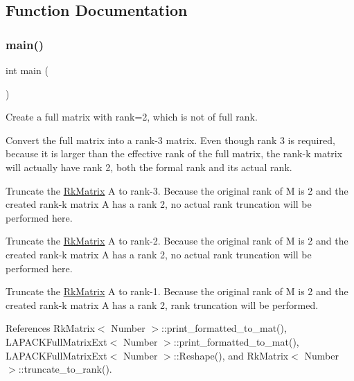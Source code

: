 \subsection{Function Documentation}
\mbox{\label{rkmatrix-truncate-to-rank_8cc_ae66f6b31b5ad750f1fe042a706a4e3d4}} 
\subsubsection{\texorpdfstring{main()}{main()}}
{\footnotesize\ttfamily int main (\begin{DoxyParamCaption}{ }\end{DoxyParamCaption})}

Create a full matrix with rank=2, which is not of full rank.

Convert the full matrix into a rank-\/3 matrix. Even though rank 3 is required, because it is larger than the effective rank of the full matrix, the rank-\/k matrix will actually have rank 2, both the formal rank and its actual rank.

Truncate the \hyperlink{classRkMatrix}{Rk\+Matrix} {\ttfamily A} to rank-\/3. Because the original rank of {\ttfamily M} is 2 and the created rank-\/k matrix {\ttfamily A} has a rank 2, no actual rank truncation will be performed here.

Truncate the \hyperlink{classRkMatrix}{Rk\+Matrix} {\ttfamily A} to rank-\/2. Because the original rank of {\ttfamily M} is 2 and the created rank-\/k matrix {\ttfamily A} has a rank 2, no actual rank truncation will be performed here.

Truncate the \hyperlink{classRkMatrix}{Rk\+Matrix} {\ttfamily A} to rank-\/1. Because the original rank of {\ttfamily M} is 2 and the created rank-\/k matrix {\ttfamily A} has a rank 2, rank truncation will be performed.

References Rk\+Matrix$<$ Number $>$\+::print\+\_\+formatted\+\_\+to\+\_\+mat(), L\+A\+P\+A\+C\+K\+Full\+Matrix\+Ext$<$ Number $>$\+::print\+\_\+formatted\+\_\+to\+\_\+mat(), L\+A\+P\+A\+C\+K\+Full\+Matrix\+Ext$<$ Number $>$\+::\+Reshape(), and Rk\+Matrix$<$ Number $>$\+::truncate\+\_\+to\+\_\+rank().

